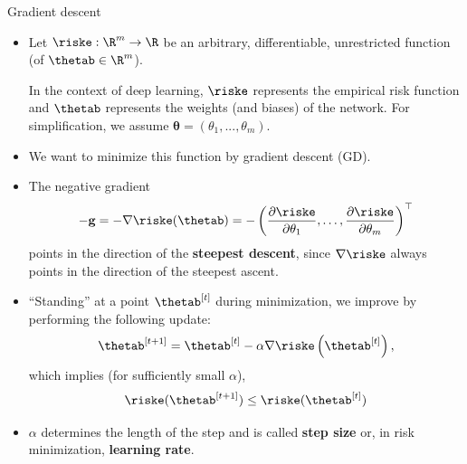 
\begin{vbframe}{Gradient descent}
  \begin{itemize}
    \item Let $\riske: \R^m \to \R$ be an arbitrary, differentiable, unrestricted function (of $\thetab \in \R^m$). \\
    \begin{footnotesize}
    In the context of deep learning, $\riske$ represents the empirical risk function and $\thetab$ represents the weights (and biases) of the network. For simplification, we assume $\bm{\theta} = (\theta_1, ..., \theta_m)$. 
    \end{footnotesize}
    \item We want to minimize this function by gradient descent (GD). 
    \item The negative gradient 
    $$
    - \mathbf{g} = - \nabla \riske(\thetab) = - \left(\frac{\partial \riske}{\partial \theta_1}, \ldots, \frac{\partial \riske}{\partial \theta_m}\right)^\top
    $$ 
    points in the direction of the \textbf{steepest descent}, since $\nabla \riske$ always points in the direction of the steepest ascent.
  \end{itemize}

    \framebreak

  \begin{itemize}
    \item \enquote{Standing} at a point $\thetab^{[t]}$ during minimization, we improve by performing the following update: 
    $$
      \thetab^{[t + 1 ]}  = \thetab^{[t]} - \alpha \nabla \riske\left(\thetab^{[t]}\right),
    $$
    which implies (for sufficiently small $\alpha$),
    $$
    \riske(\bm{\thetab}^{[t+1]}) \leq \riske(\bm{\thetab}^{[t]})
    $$
    \item $\alpha$ determines the length of the step and is called \textbf{step size} or, in risk minimization, \textbf{learning rate}.
  \end{itemize}

\end{vbframe} 


